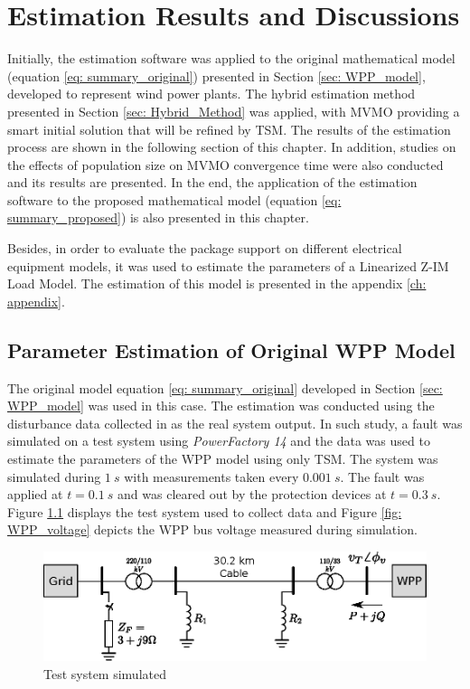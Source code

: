 \chapter{Estimation Results and Discussions}
\label{ch: Results}

Initially, the estimation software was applied to the original mathematical model (equation \ref{eq: summary_original}) presented in Section \ref{sec: WPP_model}, developed to represent wind power plants. The hybrid estimation method presented in Section \ref{sec: Hybrid_Method} was applied, with MVMO providing a smart initial solution that will be refined by TSM. The results of the estimation process are shown in the following section of this chapter. In addition, studies on the effects of population size on MVMO convergence time were also conducted and its results are presented. In the end, the application of the estimation software to the proposed mathematical model (equation \ref{eq: summary_proposed}) is also presented in this chapter.

Besides, in order to evaluate the package support on different electrical equipment models, it was used to estimate the parameters of a Linearized Z-IM Load Model. The estimation of this model is presented in the appendix \ref{ch: appendix}.

\section{Parameter Estimation of Original WPP Model}

The original model equation \eqref{eq: summary_original} developed in Section \ref{sec: WPP_model} was used in this case. The estimation was conducted using the disturbance data collected in \cite{Cari2015} as the real system output. In such study, a fault was simulated on a test system using \textit{PowerFactory 14} and the data was used to estimate the parameters of the WPP model using only TSM. The system was simulated during $1\ s$ with measurements taken every $0.001\ s$. The fault was applied at $t=0.1\ s$ and was cleared out by the protection devices at $t=0.3\ s$. Figure \ref{fig: test_system} displays the test system used to collect data and Figure \ref{fig: WPP_voltage} depicts the WPP bus voltage measured during simulation.

\begin{figure}[!h]
	\caption{Test system simulated}
	\begin{center}
		\includegraphics[scale=1]{Images/Cari_test_system.eps}
	\end{center}
	\label{fig: test_system}
\end{figure}

